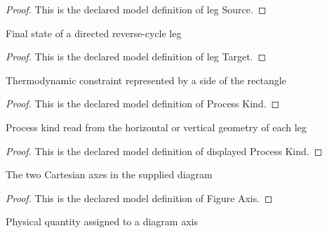 \begin{proof}
  This is the declared model definition of leg Source.
\end{proof}
\begin{definition}
  \label{def:physics:phyx-mini-0435:phyxminiproblems-problemphyxmini0435-legtarget}
  Final state of a directed reverse-cycle leg
\end{definition}
\begin{proof}
  This is the declared model definition of leg Target.
\end{proof}
\begin{definition}
  \label{def:physics:phyx-mini-0435:phyxminiproblems-problemphyxmini0435-processkind}
  Thermodynamic constraint represented by a side of the rectangle
\end{definition}
\begin{proof}
  This is the declared model definition of Process Kind.
\end{proof}
\begin{definition}
  \label{def:physics:phyx-mini-0435:phyxminiproblems-problemphyxmini0435-displayedprocesskind}
  Process kind read from the horizontal or vertical geometry of each leg
\end{definition}
\begin{proof}
  This is the declared model definition of displayed Process Kind.
\end{proof}
\begin{definition}
  \label{def:physics:phyx-mini-0435:phyxminiproblems-problemphyxmini0435-figureaxis}
  The two Cartesian axes in the supplied diagram
\end{definition}
\begin{proof}
  This is the declared model definition of Figure Axis.
\end{proof}
\begin{definition}
  \label{def:physics:phyx-mini-0435:phyxminiproblems-problemphyxmini0435-axisquantity}
  Physical quantity assigned to a diagram axis
\end{definition}
